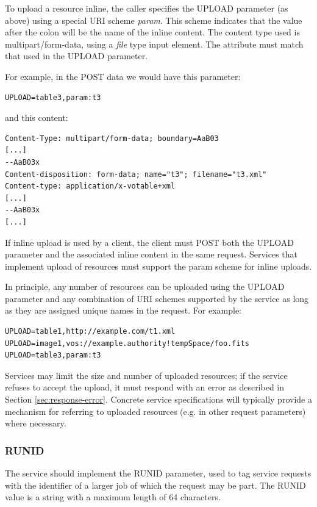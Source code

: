 \documentclass[11pt,letter]{ivoa}
\begin{document}
To upload a resource inline, the caller specifies the UPLOAD parameter (as 
above) using a special URI scheme \emph{param}. This scheme indicates that the value 
after the colon will be the name of the inline content. The content type used is 
multipart/form-data, using a \emph{file} type input element. The  attribute 
must match that used in the UPLOAD parameter.

For example, in the POST data we would have this parameter:

\begin{verbatim}
UPLOAD=table3,param:t3
\end{verbatim}

and this content:

\begin{verbatim}
Content-Type: multipart/form-data; boundary=AaB03
[...]
--AaB03x
Content-disposition: form-data; name="t3"; filename="t3.xml"
Content-type: application/x-votable+xml
[...]
--AaB03x
[...]
\end{verbatim}

If inline upload is used by a client, the client must POST both the UPLOAD 
parameter and the associated inline content in the same request. Services that 
implement upload of resources must support the param scheme for inline uploads.

In principle, any number of resources can be uploaded using the UPLOAD parameter 
and any combination of URI schemes supported by the service as long as they are 
assigned unique names in the request. For example:

\begin{verbatim}
UPLOAD=table1,http://example.com/t1.xml
UPLOAD=image1,vos://example.authority!tempSpace/foo.fits
UPLOAD=table3,param:t3
\end{verbatim}

Services may limit the size and number of uploaded resources; if the service 
refuses to accept the upload, it must respond with an error as described in 
Section \ref{sec:response-error}. Concrete service specifications will 
typically provide a mechanism for referring to uploaded resources (e.g. in 
other request parameters) where necessary.

\subsubsection{RUNID}
\label{sec:RUNID}
The service should implement the RUNID parameter, used to tag service requests 
with the identifier of a larger job of which the request may be part. The RUNID 
value is a string with a maximum length of 64 characters.
\end{document}
